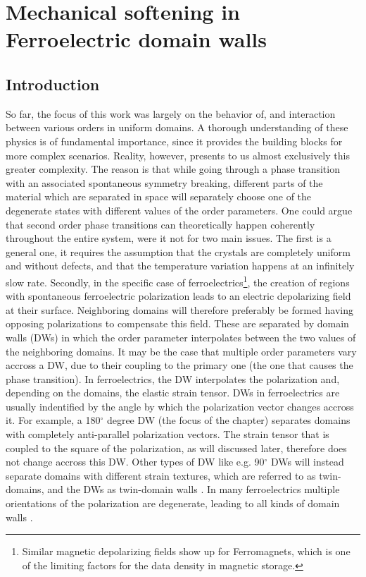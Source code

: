 \chapter{Mechanical softening in Ferroelectric domain walls}


\section{Introduction}
So far, the focus of this work was largely on the behavior of, and interaction between various orders in uniform domains.
A thorough understanding of these physics is of fundamental importance, since it provides the building blocks for more complex scenarios.
Reality, however, presents to us almost exclusively this greater complexity.
The reason is that while going through a phase transition with an associated spontaneous symmetry breaking, different parts of the material which are separated in space will separately choose one of the degenerate states with different values of the order parameters.
One could argue that second order phase transitions can theoretically happen coherently throughout the entire system, were it not for two main issues.
The first is a general one, it requires the assumption that the crystals are completely uniform and without defects, and that the temperature variation happens at an infinitely slow rate.
Secondly, in the specific case of ferroelectrics\footnote{Similar magnetic depolarizing fields show up for Ferromagnets, which is one of the limiting factors for the data density in magnetic storage.}, the creation of regions with spontaneous ferroelectric polarization leads to an electric depolarizing field at their surface.
Neighboring domains will therefore preferably be formed having opposing polarizations to compensate this field.
These are separated by domain walls (DWs) in which the order parameter interpolates between the two values of the neighboring domains.
It may be the case that multiple order parameters vary accross a DW, due to their coupling to the primary one (the one that causes the phase transition). 
In ferroelectrics, the DW interpolates the polarization and, depending on the domains, the elastic strain tensor.
DWs in ferroelectrics are usually indentified by the angle by which the polarization vector changes accross it.
For example, a 180$^\circ$ degree DW (the focus of the chapter) separates domains with completely anti-parallel polarization vectors.
The strain tensor that is coupled to the square of the polarization, as will discussed later, therefore does not change accross this DW.
Other types of DW like e.g. 90$^\circ$ DWs will instead separate domains with different strain textures, which are referred to as twin-domains, and the DWs as twin-domain walls \cite{Cao1991,Marton2010}.
In many ferroelectrics multiple orientations of the polarization are degenerate, leading to all kinds of domain walls \cite{Hu1998,Marton2010}.

